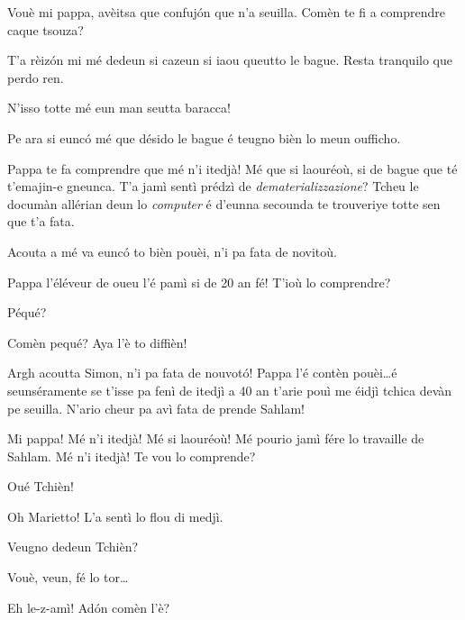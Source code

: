 \begin{drama}

\Simonspeaks Vouè mi pappa, avèitsa que confuj\'on que n’a seuilla. Comèn te fi a comprendre caque tsouza?

\Cienspeaks {} T’a rèiz\'on mi mé dedeun si cazeun si iaou queutto le bague. Resta tranquilo que perdo ren.

\Simonspeaks N’isso totte mé eun man seutta baracca!

\Cienspeaks Pe ara si eunc\'o mé que désido le bague é  teugno bièn lo meun oufficho.

\Simonspeaks Pappa te fa comprendre que mé n'i itedjà! Mé que si laouréoù, si de bague que té t'emajin-e gneunca. T’a jamì sentì prédzì de \textit{dematerializzazione}? Tcheu le documàn allérian deun lo \textit{computer} é d’eunna secounda te trouveriye totte sen que t’a fata.

\Cienspeaks Acouta a mé va eunc\'o to bièn pouèi, n’i pa fata de novitoù.

\Simonspeaks Pappa l’éléveur de oueu l’é pamì si de 20 an fé! T'ioù lo comprendre?

\Cienspeaks Péqué?

\Simonspeaks Comèn pequé? Aya l'è to diffièn!

\Cienspeaks Argh acoutta Simon, n'i pa fata de nouvot\'o! Pappa l’é contèn pouèi\ldots é seunséramente se t’isse pa fenì de itedjì a 40 an t’arie pouì me éidjì tchica devàn pe seuilla. N’ario cheur pa avì fata de prende Sahlam!

\Simonspeaks Mi pappa! Mé n'i itedjà! Mé si laouréoù! Mé pourio jamì fére lo travaille de Sahlam. Mé n'i itedjà! Te vou lo comprende?

\scene[-- Marietto]


\Mariettospeaks Oué Tchièn!

\Cienspeaks Oh Marietto!  L’a sentì lo flou di medjì.

\Mariettospeaks Veugno dedeun Tchièn?

\Cienspeaks Vouè, veun, fé lo tor\ldots


\Mariettospeaks Eh le-z-amì! Ad\'on comèn l’è?


\end{drama}

